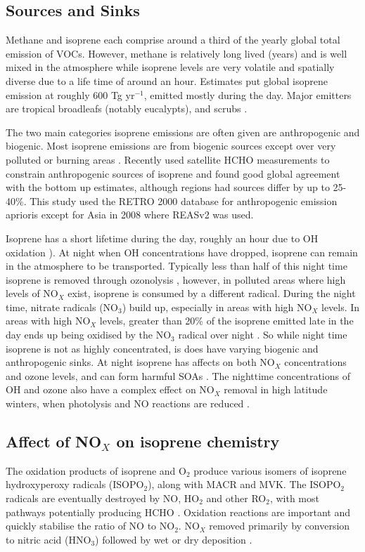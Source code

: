   \subsection{Sources and Sinks}
    Methane and isoprene each comprise around a third of the yearly global total emission of VOCs.
    However, methane is relatively long lived (years) and is well mixed in the atmosphere while isoprene levels are very volatile and spatially diverse due to a life time of around an hour.
    Estimates put global isoprene emission at roughly 600 Tg yr$^{-1}$, emitted mostly during the day.
    Major emitters are tropical broadleafs (notably eucalypts), and scrubs \citep{Guenther2006, Arneth2008, Niinemets2010, Monks2015}.

   The two main categories isoprene emissions are often given are anthropogenic and biogenic. 
   Most isoprene emissions are from biogenic sources except over very polluted or burning areas \citep{Guenther2006}.
   Recently \cite{Stavrakou2015} used satellite HCHO measurements to constrain anthropogenic sources of isoprene and found good global agreement with the bottom up estimates, although regions had sources differ by up to 25-40\%. 
   This study used the RETRO 2000 database for anthropogenic emission aprioris except for Asia in 2008 where REASv2 was used. 
    
    Isoprene has a short lifetime during the day, roughly an hour due to OH oxidation \citep{AtkinsonArey2003}).
    At night when OH concentrations have dropped, isoprene can remain in the atmosphere to be transported. 
    Typically less than half of this night time isoprene is removed through ozonolysis \citep{AtkinsonArey2003}, however, in polluted areas where high levels of NO$_X$ exist, isoprene is consumed by a different radical.
    During the night time, nitrate radicals (NO$_3$) build up, especially in areas with high NO$_X$ levels.
    In areas with high NO$_X$ levels, greater than 20\% of the isoprene emitted late in the day ends up being oxidised by the NO$_3$ radical over night \citep{Brown2009}.
    So while night time isoprene is not as highly concentrated, is does have varying biogenic and anthropogenic sinks.
    At night isoprene has affects on both NO$_X$ concentrations and ozone levels, and can form harmful SOAs \citep{Brown2009, Mao2013}.
    The nighttime  concentrations of OH and ozone also have a complex effect on NO$_X$ removal in high latitude winters, when photolysis and NO reactions are reduced \citep{Ayers2006}.
    
  \subsection{Affect of NO$_X$ on isoprene chemistry}
    \label{Ch_LitRev:sec:IsopNox}
    The oxidation products of isoprene and O$_2$ produce various isomers of isoprene hydroxyperoxy radicals (ISOPO$_2$), along with MACR and MVK. 
    The ISOPO$_2$ radicals are eventually destroyed by NO, HO$_2$ and other RO$_2$, with most pathways potentially producing HCHO \citep{Wolfe2016}.
    Oxidation reactions are important and quickly stabilise the ratio of NO to NO$_2$. 
    NO$_X$ removed primarily by conversion to nitric acid (HNO$_3$) followed by wet or dry deposition \citep{Ayers2006}.
    
